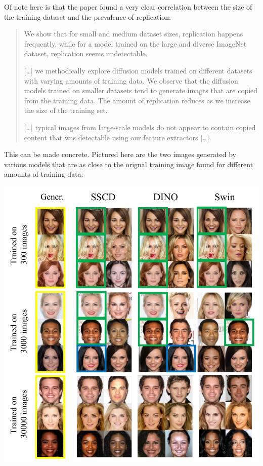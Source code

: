 \documentclass[11pt]{article}
\begin{document}
Of note here is that the paper found a very clear correlation between the size of the training dataset and the prevalence of replication:
\begin{quote}
We show that for small and medium dataset sizes, replication happens frequently, while for a model trained on the large and diverse ImageNet dataset, replication seems undetectable.

[\ldots{}] we methodically explore diffusion models trained on different datasets with varying amounts of training data. We observe that the diffusion models trained on smaller datasets tend to generate images that are copied from the training data. The amount of replication reduces as we increase the size of the training set.

[\ldots{}] typical images from large-scale models do not appear to contain copied content that was detectable using our feature extractors [\ldots{}].
\end{quote}

This can be made concrete. Pictured here are the two images generated by various models that are as close to the orignal training image found for different amounts of training data:
\begin{center}
\includegraphics[width=.9\linewidth]{./images/replication-faces.png}
\end{center}
\end{document}
